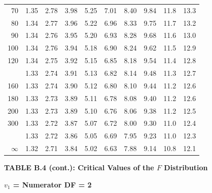 \documentclass[10pt]{article}
\begin{document}
\begin{longtable}{@{}r!{\vrule width 0.8pt\hspace{0.55em}}rrrrrrrrr@{}}
70 & 1.35 & 2.78 & 3.98 & 5.25 & 7.01 & 8.40 & 9.84 & 11.8 & 13.3 \\
80 & 1.34 & 2.77 & 3.96 & 5.22 & 6.96 & 8.33 & 9.75 & 11.7 & 13.2 \\
90 & 1.34 & 2.76 & 3.95 & 5.20 & 6.93 & 8.28 & 9.68 & 11.6 & 13.0 \\
100 & 1.34 & 2.76 & 3.94 & 5.18 & 6.90 & 8.24 & 9.62 & 11.5 & 12.9 \\
120 & 1.34 & 2.75 & 3.92 & 5.15 & 6.85 & 8.18 & 9.54 & 11.4 & 12.8 \\
 & 1.33 & 2.74 & 3.91 & 5.13 & 6.82 & 8.14 & 9.48 & 11.3 & 12.7 \\
160 & 1.33 & 2.74 & 3.90 & 5.12 & 6.80 & 8.10 & 9.44 & 11.2 & 12.6 \\
180 & 1.33 & 2.73 & 3.89 & 5.11 & 6.78 & 8.08 & 9.40 & 11.2 & 12.6 \\
200 & 1.33 & 2.73 & 3.89 & 5.10 & 6.76 & 8.06 & 9.38 & 11.2 & 12.5 \\
300 & 1.33 & 2.72 & 3.87 & 5.07 & 6.72 & 8.00 & 9.30 & 11.0 & 12.4 \\
 & 1.33 & 2.72 & 3.86 & 5.05 & 6.69 & 7.95 & 9.23 & 11.0 & 12.3 \\
$\infty$ & 1.32 & 2.71 & 3.84 & 5.02 & 6.63 & 7.88 & 9.14 & 10.8 & 12.1 \\
\end{longtable}
\newpage
\thispagestyle{empty}
\begin{center}
{\large\bfseries TABLE B.4 (cont.): Critical Values of the $F$ Distribution\par}
\end{center}
{\large\bfseries $v_1$ = Numerator DF = 2\par}
\vspace{0.5em}
\small
\end{document}
